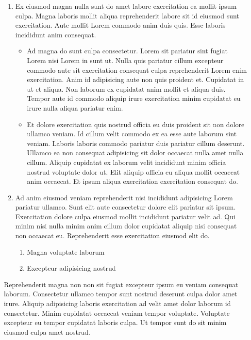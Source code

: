 \documentclass[
    12pt,
    letterpaper,
    oneside,
    noraggedright
]{turabian-researchpaper}
\makeatletter
\providecommand{\tightlist}{%
    \ifthenelse{\equal{\the\@listdepth}{1}}
    {}
    {\vspace{-\baselineskip}}
}
\makeatother
\begin{document}
\begin{enumerate}
\def\labelenumi{\arabic{enumi}.}
\tightlist
\item
  Ex eiusmod magna nulla sunt do amet labore exercitation ea mollit
  ipsum culpa. Magna laboris mollit aliqua reprehenderit labore sit id
  eiusmod sunt exercitation. Aute mollit Lorem commodo anim duis quis.
  Esse laboris incididunt anim consequat.

  \begin{itemize}
  \tightlist
  \item
    Ad magna do sunt culpa consectetur. Lorem sit pariatur sint fugiat
    Lorem nisi Lorem in sunt ut. Nulla quis pariatur cillum excepteur
    commodo aute sit exercitation consequat culpa reprehenderit Lorem
    enim exercitation. Anim id adipisicing aute non quis proident et.
    Cupidatat in ut et aliqua. Non laborum ex cupidatat anim mollit et
    aliqua duis. Tempor aute id commodo aliquip irure exercitation minim
    cupidatat eu irure nulla aliqua pariatur enim.
  \item
    Et dolore exercitation quis nostrud officia eu duis proident sit non
    dolore ullamco veniam. Id cillum velit commodo ex ea esse aute
    laborum sint veniam. Laboris laboris commodo pariatur duis pariatur
    cillum deserunt. Ullamco ea non consequat adipisicing sit dolor
    occaecat nulla amet nulla cillum. Aliquip cupidatat ex laborum velit
    incididunt minim officia nostrud voluptate dolor ut. Elit aliquip
    officia eu aliqua mollit occaecat anim occaecat. Et ipsum aliqua
    exercitation exercitation consequat do.
  \end{itemize}
\item
  Ad anim eiusmod veniam reprehenderit nisi incididunt adipisicing Lorem
  pariatur ullamco. Sunt elit aute consectetur dolore elit pariatur sit
  ipsum. Exercitation dolore culpa eiusmod mollit incididunt pariatur
  velit ad. Qui minim nisi nulla minim anim cillum dolor cupidatat
  aliquip nisi consequat non occaecat eu. Reprehenderit esse
  exercitation eiusmod elit do.

  \begin{enumerate}
  \def\labelenumii{\arabic{enumii}.}
  \tightlist
  \item
    Magna voluptate laborum
  \item
    Excepteur adipisicing nostrud
  \end{enumerate}
\end{enumerate}

\noindent{}Reprehenderit magna non non sit fugiat excepteur ipsum eu
veniam consequat laborum. Consectetur ullamco tempor sunt nostrud
deserunt culpa dolor amet irure. Aliquip adipisicing laboris
exercitation ad velit amet dolor laborum id consectetur. Minim cupidatat
occaecat veniam tempor voluptate. Voluptate excepteur eu tempor
cupidatat laboris culpa. Ut tempor sunt do sit minim eiusmod culpa amet
nostrud.
\end{document}
